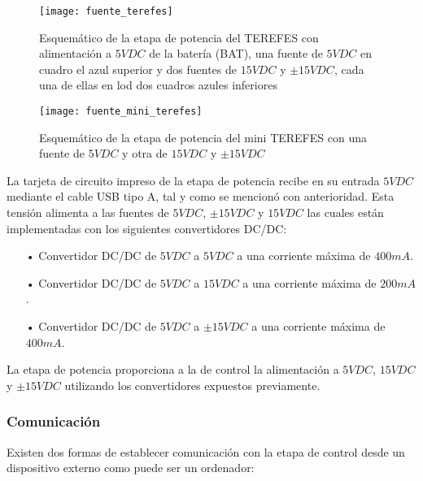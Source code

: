 \begin{figure}[!htb]
  \texttt{[image: fuente\_terefes]}
  \caption{Esquemático de la etapa de potencia del TEREFES con alimentación a $5VDC$ de la batería (BAT), una fuente de $5VDC$ en cuadro el azul superior y dos fuentes de $15VDC$ y $\pm15VDC$, cada una de ellas en lod dos cuadros azules inferiores}\label{fig:fuente_terefes}
\endminipage\hfill
{}
  \texttt{[image: fuente\_mini\_terefes]}
  \caption{Esquemático de la etapa de potencia del mini TEREFES con una fuente de $5VDC$ y otra de $15VDC$ y $\pm15VDC$}\label{fig:fuente_mini_terefes}
\endminipage\hfill
\end{figure}

La tarjeta de circuito impreso de la etapa de potencia recibe en su entrada $5VDC$ mediante el cable USB tipo A, tal y como se mencionó con anterioridad. Esta tensión alimenta a las fuentes de $5VDC$, $\pm15VDC$ y $15VDC$ las cuales están implementadas con los siguientes convertidores DC/DC:

\begin{itemize}
\item[•] Convertidor DC/DC de $5VDC$ a $5VDC$ a una corriente máxima de $400mA$.

\item[•] Convertidor DC/DC de $5VDC$ a $15VDC$ a una corriente máxima de $200mA$.

\item[•] Convertidor DC/DC de $5VDC$ a $\pm15VDC$ a una corriente máxima de $400mA$.
\end{itemize}

La etapa de potencia proporciona a la de control la alimentación a $5VDC$, $15VDC$ y $\pm15VDC$ utilizando los convertidores expuestos previamente. 

\subsubsection{Comunicación}
Existen dos formas de establecer comunicación con la etapa de control desde un dispositivo externo como puede ser un ordenador:

